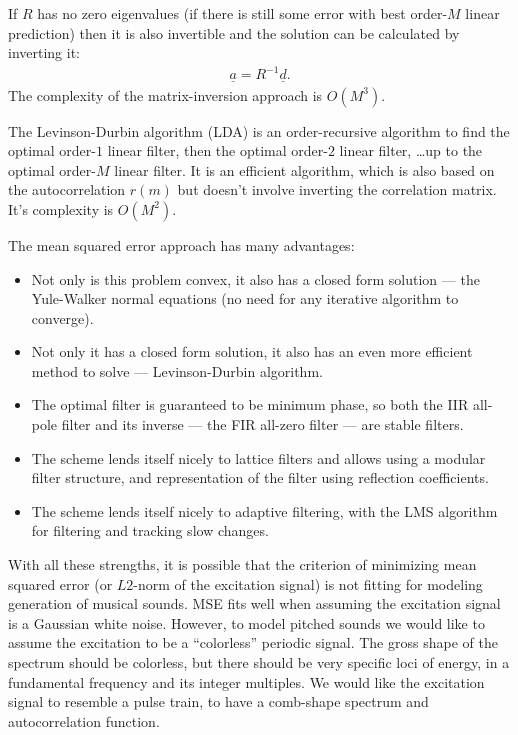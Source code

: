 \documentclass[journal,onecolumn]{IEEEtran}
\begin{document}
If $R$ has no zero eigenvalues (if there is still some error with best order-$M$ linear prediction) then it is also invertible and the solution can be calculated by inverting it:
\begin{align*}
\underline{a} = R^{-1} \underline{d}.
\end{align*}
The complexity of the matrix-inversion approach is $O(M^3)$.

The Levinson-Durbin algorithm (LDA) is an order-recursive algorithm to find the optimal order-$1$ linear filter, then the optimal order-$2$ linear filter, \ldots up to the optimal order-$M$ linear filter. It is an efficient algorithm, which is also based on the autocorrelation $r(m)$ but doesn't involve inverting the correlation matrix. It's complexity is $O(M^2)$.



The mean squared error approach has many advantages:
\begin{itemize}
  \item Not only is this problem convex, it also has a closed form solution --- the Yule-Walker normal equations (no need for any iterative algorithm to converge).
  \item Not only it has a closed form solution, it also has an even more efficient method to solve --- Levinson-Durbin algorithm.
  \item The optimal filter is guaranteed to be minimum phase, so both the IIR all-pole filter and its inverse --- the FIR all-zero filter --- are stable filters.
  \item The scheme lends itself nicely to lattice filters and allows using a modular filter structure, and representation of the filter using reflection coefficients.
  \item The scheme lends itself nicely to adaptive filtering, with the LMS algorithm for filtering and tracking slow changes.
\end{itemize}

With all these strengths, it is possible that the criterion of minimizing mean squared error (or $L2$-norm of the excitation signal) is not fitting for modeling generation of musical sounds. MSE fits well when assuming the excitation signal is a Gaussian white noise. However, to model pitched sounds we would like to assume the excitation to be a ``colorless'' periodic signal. The gross shape of the spectrum should be colorless, but there should be very specific loci of energy, in a fundamental frequency and its integer multiples. We would like the excitation signal to resemble a pulse train, to have a comb-shape spectrum and autocorrelation function.
\end{document}
